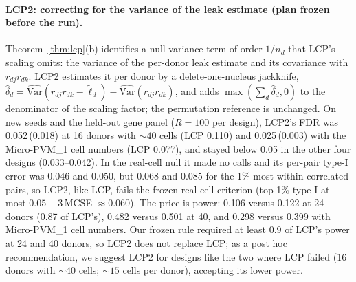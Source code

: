 \paragraph{LCP2: correcting for the variance of the leak estimate (plan frozen before the run).} Theorem~\ref{thm:lcp}(b) identifies a null variance term of order $1/n_d$ that LCP's scaling omits: the variance of the per-donor leak estimate and its covariance with $r_{dj}r_{dk}$. LCP2 estimates it per donor by a delete-one-nucleus jackknife, $\hat\delta_d=\widehat{\mathrm{Var}}(r_{dj}r_{dk}-\tilde\ell_d)-\widehat{\mathrm{Var}}(r_{dj}r_{dk})$, and adds $\max(\sum_d\hat\delta_d,0)$ to the denominator of the scaling factor; the permutation reference is unchanged. On new seeds and the held-out gene panel ($R=100$ per design), LCP2's FDR was 0.052\,(0.018) at 16 donors with ${\sim}40$ cells (LCP 0.110) and 0.025\,(0.003) with the Micro-PVM\_1 cell numbers (LCP 0.077), and stayed below 0.05 in the other four designs (0.033--0.042). In the real-cell null it made no calls and its per-pair type-I error was 0.046 and 0.050, but 0.068 and 0.085 for the 1\% most within-correlated pairs, so LCP2, like LCP, fails the frozen real-cell criterion (top-1\% type-I at most $0.05+3$\,MCSE $\approx0.060$). The price is power: 0.106 versus 0.122 at 24 donors (0.87 of LCP's), 0.482 versus 0.501 at 40, and 0.298 versus 0.399 with Micro-PVM\_1 cell numbers. Our frozen rule required at least 0.9 of LCP's power at 24 and 40 donors, so LCP2 does not replace LCP; as a post hoc recommendation, we suggest LCP2 for designs like the two where LCP failed (16 donors with ${\sim}40$ cells; ${\sim}15$ cells per donor), accepting its lower power.
